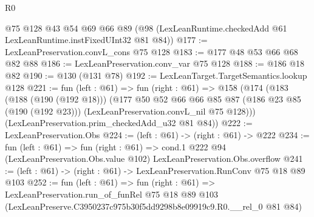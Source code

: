 \begin{lexlean}{R0}
\begin{coremodule}
    @75
    @128
    @43
    @54
    @69
    @66
    @89
    (@98 (LexLeanRuntime.checkedAdd @61 LexLeanRuntime.instFixedUInt32 @81 @84))
@177 := LexLeanPreservation.convL_cons @75 @128
@183 := @177 @48 @53 @66 @68 @82 @88
@186 := LexLeanPreservation.conv_var @75 @128
@188 := @186 @18 @82
@190 := @130 (@131 @78)
@192 := LexLeanTarget.TargetSemantics.lookup @128
@221 := fun (left : @61) =>
  fun (right : @61) =>
  @158
    (@174
      (@183
        (@188 (@190 (@192 @18)))
        (@177
          @50
          @52
          @66
          @66
          @85
          @87
          (@186 @23 @85 (@190 (@192 @23)))
          (LexLeanPreservation.convL_nil @75 @128)))
      (LexLeanPreservation.prim_checkedAdd_u32 @81 @84))
@222 := LexLeanPreservation.Obs
@224 := (left : @61) -> (right : @61) -> @222
@234 := fun (left : @61) =>
  fun (right : @61) =>
  cond.{1} @222 @94 (LexLeanPreservation.Obs.value @102) LexLeanPreservation.Obs.overflow
@241 := (left : @61) -> (right : @61) -> LexLeanPreservation.RunConv @75 @18 @89 @103
@252 := fun (left : @61) =>
  fun (right : @61) =>
  LexLeanPreservation.run_of_funRel
    @75
    @18
    @89
    @103
    (LexLeanPreserve.C3950237c975b30f5dd9298b8e09919c9.R0.__rel_0 @81 @84)
\end{coremodule}
\end{lexlean}
